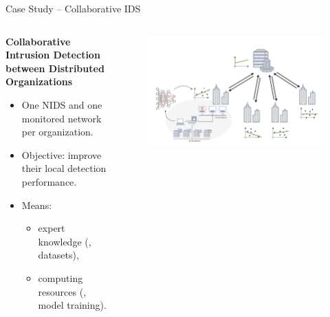 \begin{frame}{Case Study -- Collaborative IDS}

  \begin{columns}
    \begin{column}{0.4\textwidth}
      \textbf{Collaborative Intrusion Detection between Distributed Organizations}
  \begin{itemize}[<+->]
    \item One NIDS and one monitored network per organization.
    \item Objective: improve their local detection performance.
    \item Means:
    \begin{itemize}
        \item expert knowledge (\ie, datasets),
        \item computing resources (\ie, model training).
    \end{itemize}
  \end{itemize}
    \end{column}
    
    \begin{column}{0.6\textwidth}
      \begin{figure}
        \centering
        \includegraphics[width=1.1\linewidth,right]{figures/intro/cids.drawio.pdf}
      \end{figure}
    \end{column}
  \end{columns}
\end{frame}



